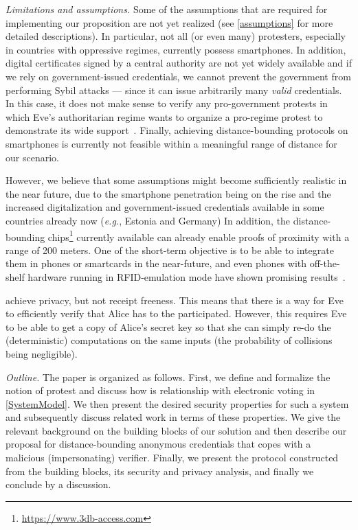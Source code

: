 \emph{Limitations and assumptions.} Some of the assumptions that are required for implementing our proposition are not yet realized (see \cref{assumptions} for more detailed descriptions). 
In particular, not all (or even many) protesters, especially in countries with oppressive regimes, currently possess smartphones.
In addition, digital certificates signed by a central authority are not yet widely available and if we rely on government-issued credentials, we cannot prevent the government from performing Sybil attacks --- since it can issue arbitrarily many \emph{valid} credentials. 
In this case, it does not make sense to verify any pro-government protests in which Eve's authoritarian regime wants to organize a pro-regime protest to demonstrate its wide support~\cite[e.g.][]{AlJazeeraOnVenezuela2017,VenezuelanStateWorkersCalledToParticipate}.
Finally, achieving distance-bounding protocols on smartphones is currently not feasible within a meaningful range of distance for our scenario. 

However, we believe that some assumptions might become sufficiently realistic in the near future, due to the smartphone penetration being on the rise and the increased digitalization and government-issued credentials available in some countries already now (\emph{e.g.}, Estonia and Germany)
In addition, the distance-bounding chips\footnote{\url{https://www.3db-access.com}} currently available can already enable proofs of proximity with a range of 200 meters.
One of the short-term objective is to be able to integrate them in phones or smartcards in the near-future, and even phones with off-the-shelf hardware running in RFID-emulation mode have shown promising results~\cite{DBonSmartphones}.

\PRIVO achieve privacy, but not receipt freeness.
This means that there is a way for Eve to efficiently verify that Alice has to the participated.
However, this requires Eve to be able to get a copy of Alice's secret key so that she can simply re-do the (deterministic) computations on the same inputs (the probability of collisions being negligible).

\emph{Outline.} The paper is organized as follows. 
First, we define and formalize the notion of protest and discuss how is relationship with electronic voting in \cref{SystemModel}.  
We then present the desired security properties for such a system and subsequently discuss related work in terms of these properties. 
We give the relevant background on the building blocks of our solution \PRIVO and then describe our proposal for distance-bounding anonymous credentials that copes with a malicious (impersonating) verifier. 
Finally, we present the protocol constructed from the building blocks, its security and privacy analysis, and finally we conclude by a discussion. 